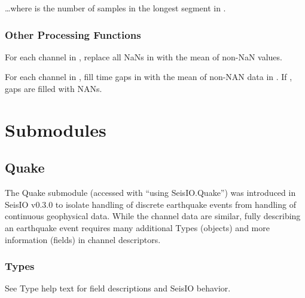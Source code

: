 \documentclass[letterpaper,11pt,english]{sphinxmanual}
\begin{document}
…where  is the number of samples in the longest segment in .


\subsection{Other Processing Functions}
\label{\detokenize{src/Processing/processing:other-processing-functions}}

\begin{fulllineitems}
\end{fulllineitems}


For each channel  in , replace all NaNs in  with the mean
of non-NaN values.


\begin{fulllineitems}
\end{fulllineitems}


For each channel  in , fill time gaps in  with the mean of
non-NAN data in . If , gaps are filled with NANs.


\chapter{Submodules}
\label{\detokenize{index:submodules}}

\section{Quake}
\label{\detokenize{src/Submodules/quake:quake}}\label{\detokenize{src/Submodules/quake::doc}}
The Quake submodule (accessed with “using SeisIO.Quake”) was introduced in
SeisIO v0.3.0 to isolate handling of discrete earthquake events from handling
of continuous geophysical data. While the channel data are similar, fully
describing an earthquake event requires many additional Types (objects) and
more information (fields) in channel descriptors.


\subsection{Types}
\label{\detokenize{src/Submodules/quake:types}}
See Type help text for field descriptions and SeisIO behavior.
\end{document}
